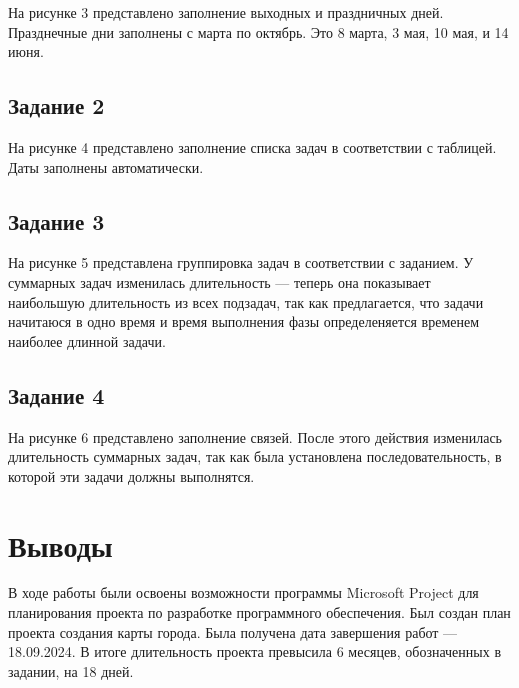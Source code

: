
На рисунке 3 представлено заполнение выходных и праздничных дней. Празднечные дни заполнены с марта по октябрь. Это 8 марта, 3 мая, 10 мая, и 14 июня.


\subsection{Задание 2}
На рисунке 4 представлено заполнение списка задач в соответствии с таблицей. Даты заполнены автоматически.



\subsection{Задание 3}
На рисунке 5 представлена группировка задач в соответствии с заданием.  У суммарных задач изменилась длительность — теперь она показывает наибольшую длительность из всех подзадач, так как предлагается, что задачи начитаюся в одно время и время выполнения фазы   определеняется временем наиболее длинной задачи.



\subsection{Задание 4}
На рисунке 6 представлено заполнение связей. После этого действия изменилась длительность суммарных задач, так как была установлена последовательность, в которой эти задачи должны выполнятся.



\section{Выводы}
В ходе работы были освоены возможности программы Microsoft Project для планирования проекта по разработке программного обеспечения. Был  создан план проекта создания карты города. Была получена дата завершения работ — 18.09.2024. В итоге длительность проекта превысила 6 месяцев, обозначенных в задании, на 18 дней.
